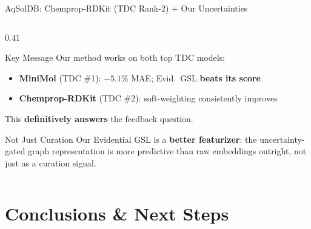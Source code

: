 \documentclass[aspectratio=169]{beamer}
\begin{document}
\begin{frame}[t,shrink=10]{AqSolDB: Chemprop-RDKit (TDC Rank-2) + Our Uncertainties}
\begin{columns}[T]
\begin{column}{0.41\textwidth}
\begin{alertblock}{Key Message}
\footnotesize Our method works on both top TDC models:
\begin{itemize}
  \item \textbf{MiniMol} (TDC \#1): $-5.1\%$ MAE; Evid.\ GSL \textbf{beats its score}
  \item \textbf{Chemprop-RDKit} (TDC \#2): soft-weighting consistently improves
\end{itemize}
This \textbf{definitively answers} the feedback question.
\end{alertblock}
\vspace{4pt}
\begin{block}{Not Just Curation}
\footnotesize Our Evidential GSL is a \textbf{better featurizer}: the uncertainty-gated graph representation is more predictive than raw embeddings outright, not just as a curation signal.
\end{block}
\end{column}
\end{columns}
\end{frame}

\section{Conclusions \& Next Steps}
\end{document}
